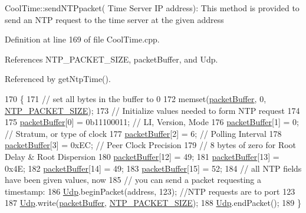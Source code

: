 Cool\+Time\+::send\+N\+T\+Ppacket( Time Server I\+P address)\+: This method is provided to send an N\+TP request to the time server at the given address 

Definition at line 169 of file Cool\+Time.\+cpp.



References N\+T\+P\+\_\+\+P\+A\+C\+K\+E\+T\+\_\+\+S\+I\+ZE, packet\+Buffer, and Udp.



Referenced by get\+Ntp\+Time().


\begin{DoxyCode}
170 \{
171     \textcolor{comment}{// set all bytes in the buffer to 0}
172     memset(\hyperlink{classCoolTime_a27e6abc82a5c2f72161956967005bec7}{packetBuffer}, 0, \hyperlink{CoolTime_8h_a56a6ea64006651b4f42adf713e244f06}{NTP\_PACKET\_SIZE});
173     \textcolor{comment}{// Initialize values needed to form NTP request}
174 
175     \hyperlink{classCoolTime_a27e6abc82a5c2f72161956967005bec7}{packetBuffer}[0] = 0b11100011;   \textcolor{comment}{// LI, Version, Mode}
176     \hyperlink{classCoolTime_a27e6abc82a5c2f72161956967005bec7}{packetBuffer}[1] = 0;     \textcolor{comment}{// Stratum, or type of clock}
177     \hyperlink{classCoolTime_a27e6abc82a5c2f72161956967005bec7}{packetBuffer}[2] = 6;     \textcolor{comment}{// Polling Interval}
178     \hyperlink{classCoolTime_a27e6abc82a5c2f72161956967005bec7}{packetBuffer}[3] = 0xEC;  \textcolor{comment}{// Peer Clock Precision}
179     \textcolor{comment}{// 8 bytes of zero for Root Delay & Root Dispersion}
180     \hyperlink{classCoolTime_a27e6abc82a5c2f72161956967005bec7}{packetBuffer}[12]  = 49;
181     \hyperlink{classCoolTime_a27e6abc82a5c2f72161956967005bec7}{packetBuffer}[13]  = 0x4E;
182     \hyperlink{classCoolTime_a27e6abc82a5c2f72161956967005bec7}{packetBuffer}[14]  = 49;
183     \hyperlink{classCoolTime_a27e6abc82a5c2f72161956967005bec7}{packetBuffer}[15]  = 52;
184     \textcolor{comment}{// all NTP fields have been given values, now}
185     \textcolor{comment}{// you can send a packet requesting a timestamp:                 }
186     \hyperlink{classCoolTime_a4e23216a8121ca79d0fb019f30884b92}{Udp}.beginPacket(address, 123); \textcolor{comment}{//NTP requests are to port 123}
187     \hyperlink{classCoolTime_a4e23216a8121ca79d0fb019f30884b92}{Udp}.write(\hyperlink{classCoolTime_a27e6abc82a5c2f72161956967005bec7}{packetBuffer}, \hyperlink{CoolTime_8h_a56a6ea64006651b4f42adf713e244f06}{NTP\_PACKET\_SIZE});
188     \hyperlink{classCoolTime_a4e23216a8121ca79d0fb019f30884b92}{Udp}.endPacket();
189 \}
\end{DoxyCode}
